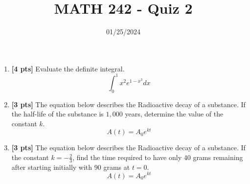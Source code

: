\documentclass[12pt]{article}
\title{MATH 242 - Quiz 2}
\date{01/25/2024}
\begin{document}
\maketitle


\begin{enumerate}

\item \textbf{[4 pts]} Evaluate the definite integral. $$\int_{0}^1x^2e^{1-x^3}dx$$



\pagebreak



\item \textbf{[3 pts]} The equation below describes the Radioactive decay of a substance. If the half-life of the substance is $1,000$ years, determine the value of the constant $k$. $$A(t)=A_0e^{kt}$$

\vfill

\item \textbf{[3 pts]} The equation below describes the Radioactive decay of a substance. If the constant $k=-\frac{2}{3}$, find the time required to have only 40 grams remaining after starting initially with 90 grams at $t=0$. $$A(t)=A_0e^{kt}$$

\vfill


\end{enumerate}
\end{document}

